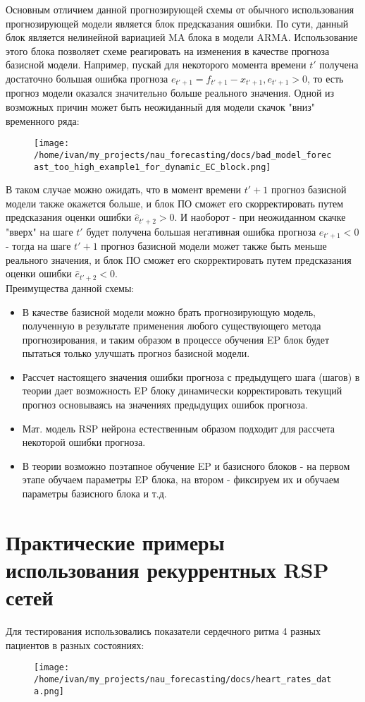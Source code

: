 \documentclass[11pt]{article}
\begin{document}
Основным отличием данной прогнозирующей схемы от обычного использования прогнозирующей модели является блок предсказания ошибки. По сути, данный блок является нелинейной вариацией MA блока в модели ARMA. Использование этого блока позволяет схеме реагировать на изменения в качестве прогноза базисной модели. Например, пускай для некоторого момента времени $t'$ получена достаточно большая ошибка прогноза $ e_{t'+1} = f_{t'+1} - x_{t'+1}, e_{t'+1} > 0 $, то есть прогноз модели оказался значительно больше реального значения. Одной из возможных причин может быть неожиданный для модели скачок "вниз" временного ряда:
\begin{figure}[H]
\centering
\texttt{[image: /home/ivan/my\_projects/nau\_forecasting/docs/bad\_model\_forecast\_too\_high\_example1\_for\_dynamic\_EC\_block.png]}
\label{}
\end{figure}

В таком случае можно ожидать, что в момент времени $t'+1$ прогноз базисной модели также окажется больше, и блок ПО сможет его скорректировать путем предсказания оценки ошибки $ \hat{e}_{t'+2} > 0$. И наоборот - при неожиданном скачке "вверх" на шаге $t'$ будет получена большая негативная ошибка прогноза $ e_{t'+1} < 0 $ - тогда на шаге $t'+1$ прогноз базисной модели может также быть меньше реального значения, и блок ПО сможет его скорректировать путем предсказания оценки ошибки $\hat{e}_{t'+2} < 0$.
\\ 
Преимущества данной схемы:
\begin{itemize}
\item В качестве базисной модели можно брать прогнозирующую модель, полученную в результате применения любого существующего метода прогнозирования, и таким образом в процессе обучения EP блок будет пытаться только улучшать прогноз базисной модели.
\item Рассчет настоящего значения ошибки прогноза с предыдущего шага (шагов) в теории дает возможность EP блоку динамически корректировать текущий прогноз основываясь на значениях предыдущих ошибок прогноза.
\item Мат. модель RSP нейрона естественным образом подходит для рассчета некоторой ошибки прогноза.
\item В теории возможно поэтапное обучение EP и базисного блоков - на первом этапе обучаем параметры EP блока, на втором - фиксируем их и обучаем параметры базисного блока и т.д.
\end{itemize}

\section*{Практические примеры использования рекуррентных RSP сетей}
Для тестирования использовались показатели сердечного ритма 4 разных пациентов в разных состояниях:
\begin{figure}[H]
\centering
\texttt{[image: /home/ivan/my\_projects/nau\_forecasting/docs/heart\_rates\_data.png]}
\label{}
\end{figure}
\end{document}
